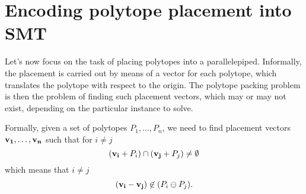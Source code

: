 \section{Encoding polytope placement into SMT}

Let's now focus on the task of placing polytopes into a parallelepiped. 
Informally, the placement is carried out by means of a vector 
for each polytope, which translates the polytope with respect to the
origin. The polytope packing problem is then the problem of finding
such placement vectors, which may or may not exist, depending on the
particular instance to solve.

Formally, given a set of polytopes $P_1, \ldots, P_n$, we need to find
placement vectors $\mathbf{v_1}, \ldots, \mathbf{v_n}$ such that for $i\not=j$
$$(\mathbf{v_i}+P_i) \cap (\mathbf{v_j}+P_j) \not= \emptyset$$ 
which means that $i\not=j$
$$(\mathbf{v_i} - \mathbf{v_j}) \not\in (P_i \ominus P_j).$$

